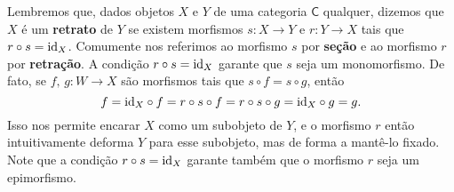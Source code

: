 \begin{obs}\label{obs:axioma_retracao_explicacao}
  Lembremos que, dados objetos $X$ e $Y$ de uma categoria $\mathsf{C}$ qualquer, dizemos que $X$ é um \textbf{retrato} de $Y$ se existem morfismos $s: X \to Y$ e $r: Y \to X$ tais que $r \circ s = \mathrm{id}_{X}$.
  Comumente nos referimos ao morfismo $s$ por \textbf{seção} e ao morfismo $r$ por \textbf{retração}.
  A condição $r \circ s = \mathrm{id}_{X}$ garante que $s$ seja um monomorfismo.
  De fato, se $f,\, g: W \to X$ são morfismos tais que $s \circ f = s \circ g$, então
  \begin{displaymath}
    f
    = \mathrm{id}_{X} \circ f
    = r \circ s \circ f
    = r \circ s \circ g
    = \mathrm{id}_{X} \circ g
    = g.
  \end{displaymath}
  Isso nos permite encarar $X$ como um subobjeto de $Y$, e o morfismo $r$ então intuitivamente deforma $Y$ para esse subobjeto, mas de forma a mantê-lo fixado.
  Note que a condição $r \circ s = \mathrm{id}_{X}$ garante também que o morfismo $r$ seja um epimorfismo.


\end{obs}
